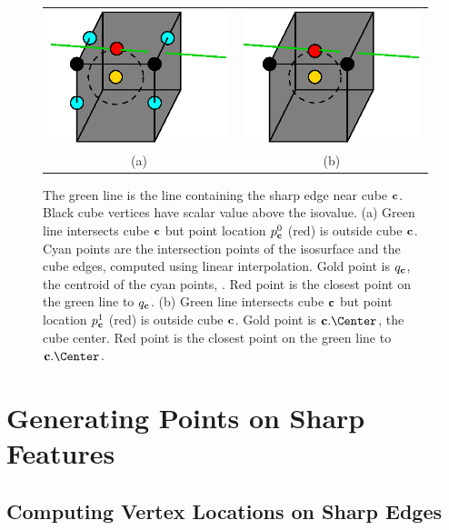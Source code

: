 \begin{figure}[t]
\centering

\begin{tabular}{cc}
\includegraphics[width=0.4\linewidth]{images/centroid.eps} \qquad &
\qquad
\includegraphics[width=0.4\linewidth]{images/center.eps} \\
(a) & (b)
\end{tabular}

\caption{The green line is the line containing the
sharp edge near cube $\mathbf{c}$. 
Black cube vertices have scalar value above the isovalue.
(a) Green line intersects cube $\mathbf{c}$
but point location $p^0_{\mathbf{c}}$ (red) is outside cube $\mathbf{c}$.
Cyan points are the intersection points of the isosurface
and the cube edges, computed using linear interpolation.
Gold point is $q_{\mathbf{c}}$, the centroid of the cyan points, .
Red point is the closest point on the green line to $q_{\mathbf{c}}$.
(b) Green line intersects cube $\mathbf{c}$
but point location $p^1_{\mathbf{c}}$ (red) is outside cube $\mathbf{c}$.
Gold point is $\cb.\protect\Center$, the cube center.
Red point is the closest point on the green line to $\cb.\protect\Center$.
}
\label{fig:out_of_cube}
\end{figure}

\section{Generating Points on Sharp Features}
\label{section:generation}

\subsection{Computing Vertex Locations on Sharp Edges}

